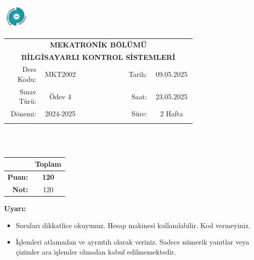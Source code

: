 \newcommand\UniversiteAdi{Niğde Ömer Halisdemir Üniversitesi}
\newcommand\BolumAdi{MEKATRONİK BÖLÜMÜ}
\newcommand\DersKodu{MKT2002}
\newcommand\DersAdi{BİLGİSAYARLI KONTROL SİSTEMLERİ}
\newcommand\SinavAdi{Ödev 4}
\newcommand\SinavTarihi{09.05.2025}
\newcommand\SinavSaati{23.05.2025}
\newcommand\SinavSuresi{2 Hafta}

\pagestyle{fancy}
\fancyhf{} %
\noindent \includegraphics[width=0.1\textwidth]{logo}
\begin{tabular}{
    p{0.15\linewidth}
    p{0.15\linewidth}
    p{0.2\linewidth}
    p{0.1\linewidth}
    p{0.15\linewidth}}
    \multicolumn{5}{c}{\textbf{\BolumAdi}}\\
    \multicolumn{5}{c}{\textbf{\DersAdi}}\\\hline
    \multicolumn{1}{|r|}{Ders Kodu:}&
    \multicolumn{1}{|c|}{\DersKodu}&
    \multicolumn{1}{|c|}{}& 
    \multicolumn{1}{|r|}{Tarih:}&
    \multicolumn{1}{|c|}{\SinavTarihi} \\\hline
    \multicolumn{1}{|r|}{Sınav Türü:}&
    \multicolumn{1}{|c|}{\SinavAdi}&  
    \multicolumn{1}{|c|}{}&
    \multicolumn{1}{|r|}{Saat:}&
    \multicolumn{1}{|c|}{\SinavSaati}\\\hline
    \multicolumn{1}{|r|}{Dönemi:}&
    \multicolumn{1}{|c|}{2024-2025}&
    \multicolumn{1}{|c|}{}&
    \multicolumn{1}{|r|}{Süre:}&
    \multicolumn{1}{|c|}{\SinavSuresi} \\\hline
    &&&&\\
\end{tabular}\\\\
\noindent\begin{center}
\begin{tabular}{|r|c|}\hline
    &\textbf{Toplam}\\\hline
    \textbf{Puan:} &\textbf{120}\\\hline
    \textbf{Not:}  &120\\\hline
\end{tabular}\end{center}
\noindent\textbf{Uyarı:}
\begin{itemize}\bfseries
    \item Soruları dikkatlice okuyunuz. Hesap makinesi kullanılabilir. Kod vermeyiniz.
    \item İşlemleri atlamadan ve ayrıntılı olarak veriniz. Sadece nümerik yanıtlar veya çizimler ara işlemler olmadan kabul edilmemektedir.
\end{itemize}
